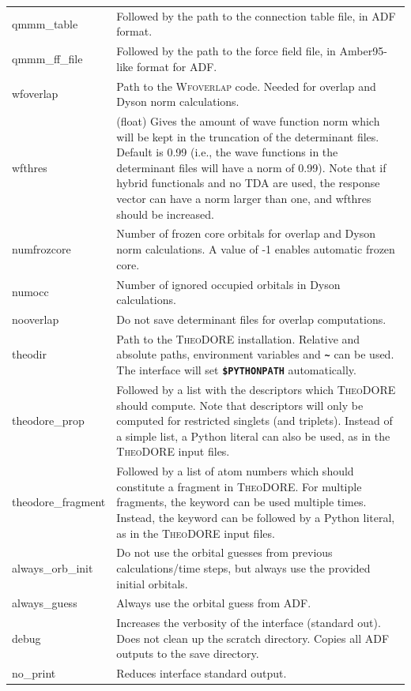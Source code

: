\documentclass[a4paper,10pt,DIV=15,openany,twoside=false]{scrbook}
\newcommand{\ttt}[1]{\textbf{\texttt{#1}}}
\begin{document}
\begin{table}
\begin{tabular}{>{\ttfamily}lp{12cm}}
\\
qmmm\_table             &Followed by the path to the connection table file, in ADF format.
\\
qmmm\_ff\_file          &Followed by the path to the force field file, in Amber95-like format for ADF.
\\
wfoverlap               &Path to the \textsc{Wfoverlap} code. Needed for overlap and Dyson norm calculations.
\\
wfthres                 &(float) Gives the amount of wave function norm which will be kept in the truncation of the determinant files. Default is 0.99 (i.e., the wave functions in the determinant files will have a norm of 0.99). Note that if hybrid functionals and no TDA are used, the response vector can have a norm larger than one, and wfthres should be increased.
\\
numfrozcore             &Number of frozen core orbitals for overlap and Dyson norm calculations. A value of -1 enables automatic frozen core.
\\
numocc                  &Number of ignored occupied orbitals in Dyson calculations.
\\
nooverlap               &Do not save determinant files for overlap computations.
\\
theodir                 &Path to the \textsc{TheoDORE} installation. Relative and absolute paths, environment variables and \ttt{\textasciitilde} can be used. The interface will set \ttt{\$PYTHONPATH} automatically.
\\
theodore\_prop          &Followed by a list with the descriptors which \textsc{TheoDORE} should compute. Note that descriptors will only be computed for restricted singlets (and triplets). Instead of a simple list, a Python literal can also be used, as in the \textsc{TheoDORE} input files.
\\
theodore\_fragment      &Followed by a list of atom numbers which should constitute a fragment in \textsc{TheoDORE}. For multiple fragments, the keyword can be used multiple times. Instead, the keyword can be followed by a Python literal, as in the \textsc{TheoDORE} input files.
\\
always\_orb\_init       &Do not use the orbital guesses from previous calculations/time steps, but always use the provided initial orbitals.
\\
always\_guess           &Always use the orbital guess from ADF.
\\
  debug                 &Increases the verbosity of the interface (standard out). Does not clean up the scratch directory. Copies all ADF outputs to the save directory.
\\
  no\_print             &Reduces interface standard output.
\\
  \bottomrule
  \end{tabular}
\end{table}
\end{document}
